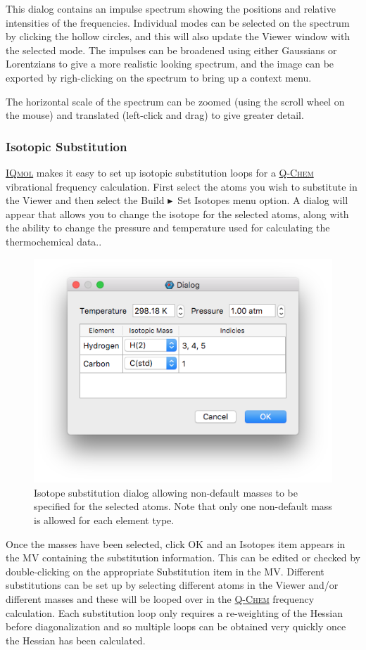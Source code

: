 \documentclass[a4paper,12pt]{article}
\newcommand{\qchem}{\href{http://q-chem.com}{{\scshape Q-Chem}}}
\newcommand{\iqmol}{\href{http://iqmol.org}{{\scshape IQmol}}}
\newcommand{\bt}{\ensuremath{\blacktriangleright}}
\begin{document}
This dialog contains an impulse spectrum showing the positions and relative
intensities of the frequencies.  Individual modes can be selected on the
spectrum by clicking the hollow circles, and this will also update the Viewer
window with the selected mode.  The impulses can be broadened using either
Gaussians or Lorentzians to give a more realistic looking spectrum, and the
image can be exported by righ-clicking on the spectrum to bring up a context
menu.

The horizontal scale of the spectrum can be zoomed (using the scroll wheel on
the mouse) and translated (left-click and drag) to give greater detail.

\subsubsection{Isotopic Substitution}

\iqmol{} makes it easy to set up isotopic substitution loops for a \qchem{}
vibrational frequency calculation.  First select the atoms  you wish to
substitute in the Viewer and then select the Build \bt\ Set Isotopes menu option.
A dialog will appear that allows you to change the isotope for the selected atoms,
along with the ability to change the pressure and temperature used for calculating
the thermochemical data..  
\begin{figure}[h]
\begin{center}
\includegraphics[scale=0.20]{figures/IsotopeDialog.png}
\caption{Isotope substitution dialog allowing non-default masses to be
specified for the selected atoms.  Note that only one non-default mass is
allowed for each element type.}
\end{center}
\end{figure}
Once the masses have been selected, click OK and an Isotopes item appears in
the MV containing the substitution information.  This can be edited or checked
by double-clicking on the appropriate Substitution item in the MV.  Different
substitutions can be set up by selecting different atoms in the Viewer and/or
different masses and these will be looped over in the \qchem{} frequency
calculation.  Each substitution loop only requires a re-weighting of the
Hessian before diagonalization and so multiple loops can be obtained very
quickly once the Hessian has been calculated.
\end{document}
